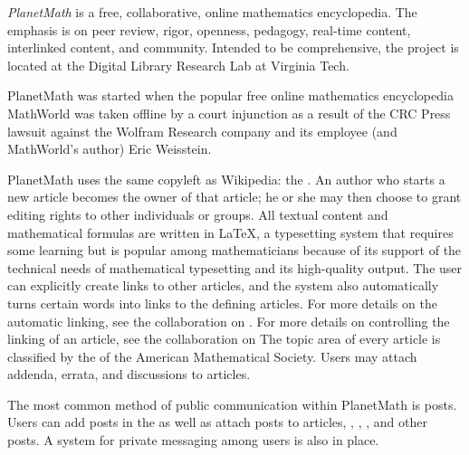 \documentclass[12pt]{article}
\begin{document}

{\em PlanetMath} is a free, collaborative, online mathematics encyclopedia. The emphasis is on peer review, rigor, openness, pedagogy, real-time content, interlinked content, and community. Intended to be comprehensive, the project is located at the Digital Library Research Lab at Virginia Tech.

PlanetMath was started when the popular free online mathematics encyclopedia MathWorld was taken offline by a court injunction as a result of the CRC Press lawsuit against the Wolfram Research company and its employee (and MathWorld's author) Eric Weisstein.

PlanetMath uses the same copyleft as Wikipedia: the . An author who starts a new article becomes the owner of that article; he or she may then choose to grant editing rights to other individuals or groups. All textual content and mathematical formulas are written in \LaTeX{}, a typesetting system that requires some learning but is popular among mathematicians because of its support of the technical needs of mathematical typesetting and its high-quality output. The user can explicitly create links to other articles, and the system also automatically turns certain words into links to the defining articles. For more details on the automatic linking, see the collaboration on . For more details on controlling the linking of an article, see the collaboration on  The topic area of every article is classified by the  of the American Mathematical Society. Users may attach addenda, errata, and discussions to articles.

The most common method of public communication within PlanetMath is posts. Users can add posts in the  as well as attach posts to articles, , , , and other posts. A system for private messaging among users is also in place.
\end{document}
